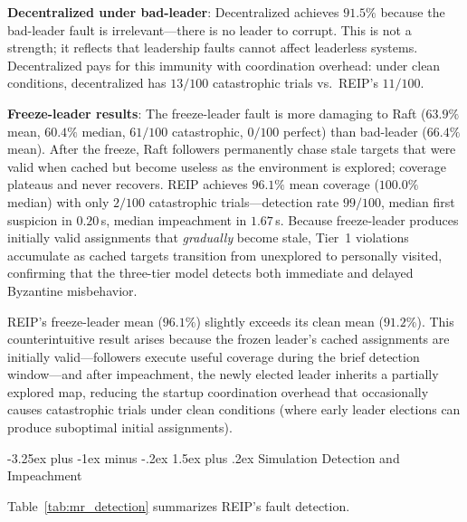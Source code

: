 \documentclass[conference]{IEEEtran}
\makeatletter
\renewcommand{\subsection}{\@startsection{subsection}{2}{\z@}%
  {-3.25ex plus -1ex minus -.2ex}%
  {1.5ex plus .2ex}%
  {\normalfont\normalsize\itshape\centering}}
\makeatother
\begin{document}
\textbf{Decentralized under bad-leader}: Decentralized achieves $91.5\%$ because the bad-leader fault is irrelevant---there is no leader to corrupt. This is not a strength; it reflects that leadership faults cannot affect leaderless systems. Decentralized pays for this immunity with coordination overhead: under clean conditions, decentralized has $13/100$ catastrophic trials vs.\ REIP's $11/100$.

\textbf{Freeze-leader results}: The freeze-leader fault is more damaging to Raft ($63.9\%$ mean, $60.4\%$ median, $61/100$ catastrophic, $0/100$ perfect) than bad-leader ($66.4\%$ mean). After the freeze, Raft followers permanently chase stale targets that were valid when cached but become useless as the environment is explored; coverage plateaus and never recovers. REIP achieves $96.1\%$ mean coverage ($100.0\%$ median) with only $2/100$ catastrophic trials---detection rate $99/100$, median first suspicion in $0.20\,$s, median impeachment in $1.67\,$s. Because freeze-leader produces initially valid assignments that \emph{gradually} become stale, Tier~1 violations accumulate as cached targets transition from unexplored to personally visited, confirming that the three-tier model detects both immediate and delayed Byzantine misbehavior.

REIP's freeze-leader mean ($96.1\%$) slightly exceeds its clean mean ($91.2\%$). This counterintuitive result arises because the frozen leader's cached assignments are initially valid---followers execute useful coverage during the brief detection window---and after impeachment, the newly elected leader inherits a partially explored map, reducing the startup coordination overhead that occasionally causes catastrophic trials under clean conditions (where early leader elections can produce suboptimal initial assignments).

\subsection{Simulation Detection and Impeachment}

Table~\ref{tab:mr_detection} summarizes REIP's fault detection.
\end{document}
